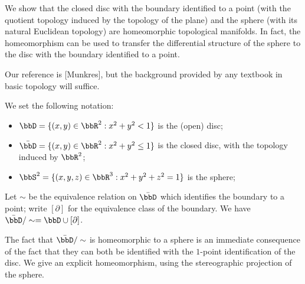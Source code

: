 

%




\newtheorem{theorem}{Theorem}[section]
 \newtheorem{corollary}[theorem]{Corollary}
 \newtheorem{lemma}[theorem]{Lemma}
 \newtheorem{proposition}[theorem]{Proposition}
 \newtheorem{conjecture}{Conjecture}
  \newtheorem{question}{\sc Question}

  \theoremstyle{definition}
 \newtheorem{definition}[theorem]{Definition}
 \newtheorem{example}[theorem]{Example}

 \theoremstyle{remark}
 \newtheorem{remark}[theorem]{Remark}
 
 \renewcommand{\O}{\mathrm{O}}


%
 
 
We show that the closed disc with the boundary identified to a point (with the quotient topology induced by the topology of the plane) and the sphere (with its natural Euclidean topology) are homeomorphic topological manifolds. In fact, the homeomorphism can be used to transfer the differential structure of the sphere to the disc with the boundary identified to a point.

Our reference is [Munkres], but the background provided by any textbook in basic topology will suffice.

We set the following notation:
\begin{itemize}
\item $\bbD = \{ (x,y) \in \bbR^2 : x^2 + y^2 < 1\}$ is the (open) disc;
\item $\bar{\bbD} = \{ (x,y) \in \bbR^2 : x^2 + y^2 \leq 1\}$ is the closed disc, with the topology induced by $\bbR^2$;
 \item $\bbS^2 = \{ (x,y,z) \in \bbR^3 : x^2 + y^2 + z^2 = 1\}$ is the sphere;
\end{itemize}

Let $\sim$ be the equivalence relation on $\bar{\bbD}$ which identifies the boundary to a point; write $[\partial]$ for the equivalence class of the boundary. We have $\bar{\bbD}/\sim = \bbD \cup [\partial]$.

The fact that $\bar{\bbD} / \sim$ is homeomorphic to a sphere is an immediate consequence of the fact that they can both be identified with the $1$-point identification of the disc. We give an explicit homeomorphism, using the stereographic projection of the sphere.


